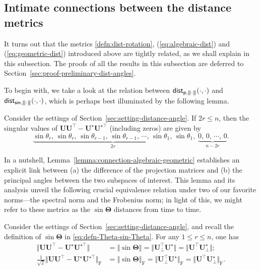 \subsection{Intimate connections between the distance metrics}
It turns out that the   metrics \eqref{defn:dist-rotation}, (\ref{eq:algebraic-dist}) and
 (\ref{eq:geometric-dist}) introduced above are tightly related, as we shall explain in this subsection.
 The proofs of all the results in this subsection are deferred to Section~\ref{sec:proof-preliminary-dist-angles}.


To begin with, we take a look at the relation between $\mathsf{dist}_{\mathsf{p},{\left\vert\kern-0.25ex\left\vert\kern-0.25ex\left\vert \cdot \right\vert\kern-0.25ex\right\vert\kern-0.25ex\right\vert}}(\cdot,\cdot)$ and $\mathsf{dist}_{\mathsf{sin},{\left\vert\kern-0.25ex\left\vert\kern-0.25ex\left\vert \cdot \right\vert\kern-0.25ex\right\vert\kern-0.25ex\right\vert}}(\cdot,\cdot)$,  which is perhaps best illuminated by the following lemma.

\begin{lemma}\label{lemma:connection-algebraic-geometric}
	Consider the settings of Section~\ref{sec:setting-distance-angle}. If $2r\leq n$, then the  singular values of $\bm{U}\bm{U}^{\top}-{\bm{U}}^{\star}{\bm{U}}^{\star\top}$ (including zeros)
are given by
\[
\underbrace{\sin\theta_{r},\, \sin\theta_{r},\, \sin\theta_{r-1},\, \sin\theta_{r-1},\,\cdots,\,\sin\theta_{1},\,\sin\theta_{1}}_{2r},\;\underbrace{0,\,0,\,\cdots,\,0}_{n-2r}.
\]
\end{lemma}
%
In a nutshell, Lemma~\ref{lemma:connection-algebraic-geometric} establishes an explicit link between (a) the difference of the projection matrices and (b) the principal angles between the two  subspaces of interest.
This lemma and its analysis unveil the following crucial equivalence relation under two of our favorite norms---the spectral norm and the Frobenius norm; in light of this, we might refer to these metrics as the $\sin{\bm{\Theta}}$ distances from time to time.


\begin{lemma}\label{prop:unitary-norm-property}
Consider the settings of Section~\ref{sec:setting-distance-angle}, and recall the definition of $\sin\bm{\Theta}$ in \eqref{eq:defn-Theta-sin-Theta}. For any $1\le r \le n$, one has
%
\begin{subequations}
\begin{align}
	\big\Vert \bm{U}\bm{U}^{\top}-{\bm{U}}^{\star}{\bm{U}}^{\star\top}\big\Vert
	& =\left\Vert \sin\bm{\Theta}\right\Vert  = \big\Vert \bm{U}_{\perp}^{\top}\bm{U}^{\star}\big\Vert = \big\Vert \bm{U}^{\top}\bm{U}_{\perp}^{\star}\big\Vert ; \label{eq:spectral-norm-equiv} \\
	\tfrac{1}{\sqrt{2}} \big\Vert \bm{U}\bm{U}^{\top}-{\bm{U}}^{\star}{\bm{U}}^{\star\top}\big\Vert _{\mathrm{F}}
	& =\left\Vert \sin\bm{\Theta}\right\Vert _{\mathrm{F}}
	=  \big\Vert \bm{U}_{\perp}^{\top}\bm{U}^{\star}\big\Vert_{\mathrm{F}} =   \big\Vert \bm{U}^{\top}\bm{U}_{\perp}^{\star} \big\Vert_{\mathrm{F}} .
	\label{eq:fro-norm-equiv}
\end{align}
\end{subequations}
\end{lemma}
%




